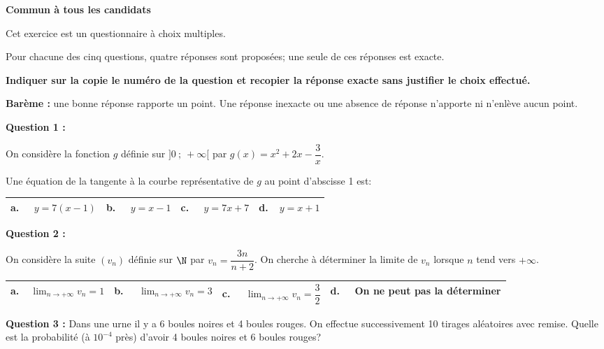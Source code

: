 
\textbf{Commun à tous les candidats}

\medskip

Cet exercice est un questionnaire à choix multiples. 

Pour chacune des cinq questions, quatre
réponses sont proposées; une seule de ces réponses est exacte.

\smallskip

\textbf{Indiquer sur la copie le numéro de la question et recopier la réponse exacte sans justifier le choix effectué.}

\textbf{Barème :} une bonne réponse rapporte un point. Une réponse inexacte ou une absence de réponse n'apporte ni n'enlève aucun point.

\bigskip

\textbf{Question 1 :}

On considère la fonction $g$ définie sur $]0~;~+\infty[$  par $g(x)= x^2+ 2x - \dfrac{3}{x}$.

Une équation de la tangente à la courbe représentative de $g$ au point d'abscisse 1 est: 
\begin{center}
\begin{tabularx}{\linewidth}{|*{4}{X|}}\hline
\textbf{a.~~} $y=7(x - 1)$&\textbf{b.~~} $y = x - 1$&\textbf{c.~~} $y = 7x + 7$&\textbf{d.~~}$ y = x +1$\\ \hline
\end{tabularx}
\end{center}

\medskip

\textbf{Question 2 :}

On considère la suite $\left(v_n\right)$ définie sur $\N$ par $v_n = \dfrac{3n}{n + 2}$. On cherche à déterminer la limite de $v_n$ lorsque $n$ tend vers $+\infty$.

\begin{center}
\begin{tabularx}{\linewidth}{|*{4}{X|}}\hline
\textbf{a.~~}$\displaystyle\lim_{n \to + \infty}v_n = 1$&
\textbf{b.~~} $\displaystyle\lim_{n \to + \infty}v_n = 3$ &  \textbf{c.~~} $\displaystyle\lim_{n \to + \infty}v_n = \dfrac{3}{2}$ &\textbf{d.~~} On ne peut pas la déterminer\\ \hline
\end{tabularx}
\end{center}

\medskip

\textbf{Question 3 :}
Dans une urne il y a 6 boules noires et 4 boules rouges. On effectue successivement 10 tirages aléatoires avec remise. Quelle est la probabilité (à $10^{-4}$ près) d'avoir 4 boules noires et 6 boules rouges?

